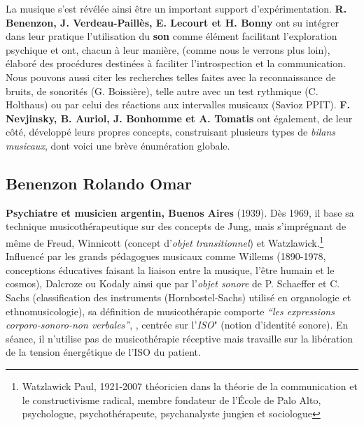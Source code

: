 	 La musique s'est révélée ainsi être un important support
         d'expérimentation.   \textbf{R. Benenzon, J. Verdeau-Paillès, E.
         Lecourt et H. Bonny} ont su intégrer dans leur pratique l'utilisation du\textbf{ son }comme
         élément facilitant l'exploration psychique et 
         ont, chacun à leur manière, (comme nous le verrons plus loin), élaboré des procédures destinées à faciliter
         l'introspection et la communication. Nous pouvons aussi citer les recherches telles faites avec la reconnaissance de
bruits, de sonorités (G. Boissière), telle autre avec un test rythmique
(C. Holthaus) ou par celui
des réactions aux intervalles musicaux (Savioz PPIT).
\textbf{F. Nevjinsky, B. Auriol, J. Bonhomme
           et A. Tomatis} ont également, de leur côté, développé leurs propres
           concepts, construisant plusieurs types de \emph{bilans musicaux},
           dont voici une brève énumération globale.
           

          \subsection{Benenzon Rolando Omar} 
	\textbf{ Psychiatre et
    musicien argentin, Buenos Aires} (1939).
	  \label{benenzon}
	  Dès 1969, il base sa technique 
	  musicothérapeutique sur des concepts 
	  de Jung, mais s'imprégnant de même de Freud, Winnicott \autocite{winnicott}
          (concept d'\textit{objet transitionnel})
          et Watzlawick.\footnote{ Watzlawick Paul, 1921-2007  théoricien dans la théorie de la communication et le constructivisme radical, membre fondateur de l'École de Palo Alto, psychologue, psychothérapeute, psychanalyste jungien et sociologue} 
	  Influencé par les grands  pédagogues musicaux comme
          Willems  (1890-1978, conceptions éducatives faisant la liaison
          entre la musique, l'être humain et le cosmos),
          Dalcroze ou Kodaly ainsi que par l'\textit{objet sonore} de
          P. Schaeffer
          et C. Sachs (classification des instruments
          (Hornbostel-Sachs) utilisé en organologie et ethnomusicologie), sa définition de musicothérapie comporte  
	  \emph{\textsl{ ``les expressions corporo-sonoro-non
              verbales''}}, \autocite{benenzon:musicotherapie},
	  centrée sur l'\textit{ISO}" (notion
          d'identité sonore). En séance, il n'utilise pas de
          musicothérapie réceptive mais travaille sur la libération de
          la tension énergétique de l'ISO du patient.

